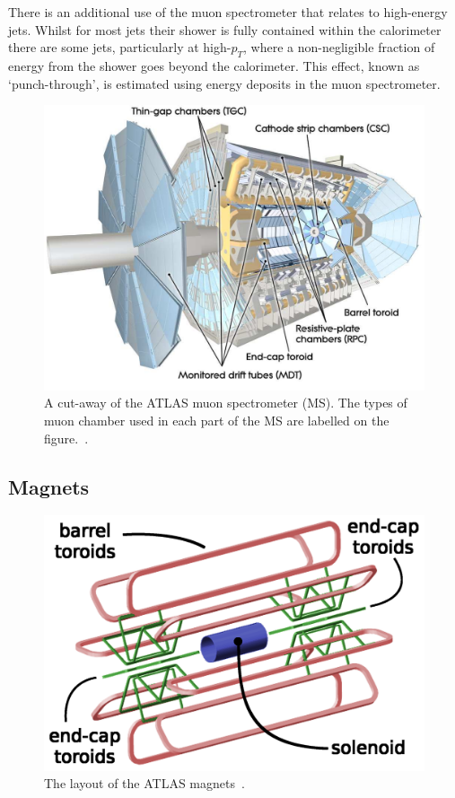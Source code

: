 There is an additional use of the muon spectrometer that relates to high-energy jets.
Whilst for most jets their shower is fully contained within the calorimeter
there are some jets, particularly at high-$p_T$, where a non-negligible fraction of energy from the shower goes beyond the calorimeter.
This effect, known as `punch-through', is estimated using energy deposits in the muon spectrometer.

\begin{figure}[!ht]
  \begin{center}
    \includegraphics[width=0.8\linewidth, angle=0]{figs/Detector/MS_schem.pdf}
  \end{center}
  \caption[A cut-away of the ATLAS muon spectrometer.]
          {A cut-away of the ATLAS muon spectrometer (MS). The types of muon chamber used in each part of the MS are labelled on the figure.~\cite{det-ATLAS_Exp}.}
  \label{fig:det-ID_schem}
\end{figure}


\subsection{Magnets}
\label{sec:det-magnets}

\begin{figure}[!ht]
  \begin{center}
    \includegraphics[width=1\linewidth, angle=0]{figs/Detector/Magnet_schem.png}
  \end{center}
  \caption[The layout of the ATLAS magnets.]{The layout of the ATLAS magnets~\cite{det-magnet_fig}.}
  \label{fig:det-magnet_schem}
\end{figure}


